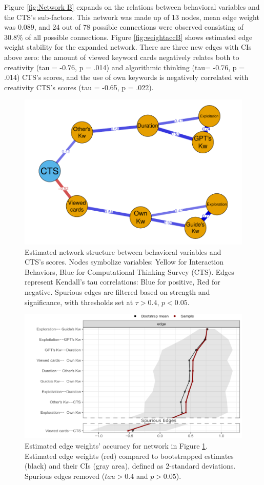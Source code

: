 \documentclass[sn-mathphys, Numbered]{sn-jnl}%
\theoremstyle{thmstyleone}%
\theoremstyle{thmstyletwo}%
\theoremstyle{thmstylethree}%
\begin{document}
Figure \ref{fig:Network B} expands on the relations between behavioral variables and the CTS's sub-factors. This network was made up of 13 nodes, mean edge weight was 0.089, and 24 out of 78 possible connections were observed consisting of 30.8\% of all possible connections. Figure \ref{fig:weightaccB} shows estimated edge weight stability for the expanded network. There are three new edges with CIs above zero: the amount of viewed keyword cards negatively relates both to creativity (tau = -0.76, p = .014) and algorithmic thinking (tau= -0.76, p = .014) CTS's scores, and the use of own keywords is negatively correlated with creativity CTS's scores (tau = -0.65, p = .022).  

\begin{figure}
    \centering
    \includegraphics[width=0.75\linewidth]{NetworkA-nolegend.pdf}
    \caption{Estimated network structure between behavioral variables and CTS's scores. Nodes symbolize variables: Yellow for Interaction Behaviors, Blue for Computational Thinking Survey (CTS). Edges represent Kendall's tau correlations: Blue for positive, Red for negative. Spurious edges are filtered based on strength and significance, with thresholds set at $\tau > 0.4$, $p < 0.05$. }
    \label{fig:Network A}
\end{figure}
\begin{figure}
    \centering
    \includegraphics[width=0.75\linewidth]{EdgewgtsAcuttedscaled.pdf}
    \caption{Estimated edge weights' accuracy for network in Figure \ref{fig:Network A}. Estimated edge weights (red) compared to bootstrapped estimates (black) and their CIs (gray area), defined as 2-standard deviations. Spurious edges removed ($tau > 0.4$ and $p > 0.05$).}
    \label{fig:WeightAccA}
\end{figure}
\end{document}
